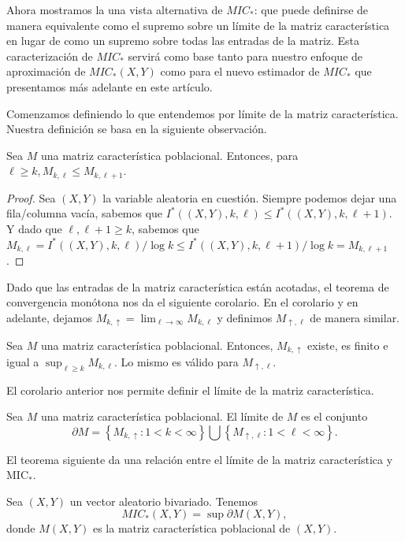	Ahora mostramos la una vista alternativa de $MIC_*$: que puede definirse de manera equivalente como el supremo sobre un l\'imite de la matriz caracter\'istica en lugar de como un supremo sobre todas las entradas de la matriz. Esta caracterizaci\'on de $MIC_*$ servir\'a como base tanto para nuestro enfoque de aproximaci\'on de $MIC_*(X, Y)$ como para el nuevo estimador de $MIC_*$ que presentamos m\'as adelante en este art\'iculo.

	Comenzamos definiendo lo que entendemos por l\'imite de la matriz caracter\'istica. Nuestra definici\'on se basa en la siguiente observaci\'on.
	\begin{prop}
		Sea $M$ una matriz caracter\'istica poblacional. Entonces, para $\ell \geq k, M_{k, \ell} \leq M_{k, \ell+1}$.
	\end{prop}
	\begin{proof}
		Sea $(X, Y)$ la variable aleatoria en cuesti\'on. Siempre podemos dejar una fila/columna vac\'ia, sabemos que $I^*((X, Y), k, \ell) \leq I^*((X, Y), k, \ell+1)$. Y dado que $\ell, \ell+1 \geq k$, sabemos que $M_{k, \ell}=I^*((X, Y), k, \ell) / \log k \leq I^*((X, Y), k, \ell+1) / \log k=M_{k, \ell+1}$.
	\end{proof}

	Dado que las entradas de la matriz caracter\'istica est\'an acotadas, el teorema de convergencia mon\'otona nos da el siguiente corolario. En el corolario y en adelante, dejamos $M_{k, \uparrow}=\lim _{\ell \rightarrow \infty} M_{k, \ell}$ y definimos $M_{\uparrow, \ell}$ de manera similar.
	\begin{cor}
		Sea $M$ una matriz caracter\'istica poblacional. Entonces, $M_{k, \uparrow}$ existe, es finito e igual a $\sup _{\ell \geq k} M_{k, \ell}$. Lo mismo es v\'alido para $M_{\uparrow, \ell}$.
	\end{cor}

	El corolario anterior nos permite definir el l\'imite de la matriz caracter\'istica.

	\begin{defn}
		Sea $M$ una matriz caracter\'istica poblacional. El l\'imite de $M$ es el conjunto
		$$
		\partial M=\left\{M_{k, \uparrow}: 1<k<\infty\right\} \bigcup\left\{M_{\uparrow, \ell}: 1<\ell<\infty\right\}.
		$$
	\end{defn}
	
	El teorema siguiente da una relaci\'on entre el l\'imite de la matriz caracter\'istica y $\mathrm{MIC}_*$.
	
	
	\begin{thm}
	Sea $(X, Y)$ un vector aleatorio bivariado. Tenemos
	$$
	M I C_*(X, Y)=\sup \partial M(X, Y),
	$$
	donde $M(X, Y)$ es la matriz caracter\'istica poblacional de $(X, Y)$.
	\end{thm}


